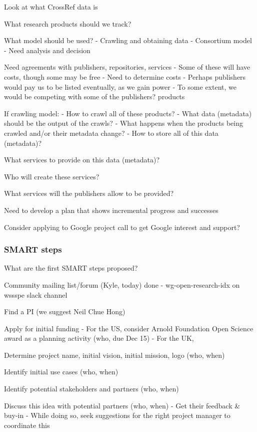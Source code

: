 Look at what CrossRef data is

What research products should we track?

What model should be used?
- Crawling and obtaining data
- Consortium model
- Need analysis and decision

Need agreements with publishers, repositories, services
- Some of these will have costs, though some may be free
- Need to determine costs
- Perhaps publishers would pay us to be listed eventually, as we gain power
- To some extent, we would be competing with some of the publishers? products

If crawling model:
- How to crawl all of these products?
- What data (metadata) should be the output of the crawls?
    - What happens when the products being crawled and/or their metadata change?
- How to store all of this data (metadata)?

What services to provide on this data (metadata)?

Who will create these services?

What services will the publishers allow to be provided?

Need to develop a plan that shows incremental progress and successes

Consider applying to Google project call to get Google interest and support?


\subsubsection{SMART steps}

What are the first SMART steps proposed?

Community mailing list/forum (Kyle, today)
done - wg-open-research-idx on wssspe slack channel

Find a PI (we suggest Neil Chue Hong)

Apply for initial funding
- For the US, consider Arnold Foundation Open Science award as a planning activity (who, due Dec 15)
- For the UK, 

Determine project name, initial vision, initial mission, logo (who, when)

Identify initial use cases (who, when)

Identify potential stakeholders and partners (who, when)

Discuss this idea with potential partners (who, when)
- Get their feedback \& buy-in
- While doing so, seek suggestions for the right project manager to coordinate this

